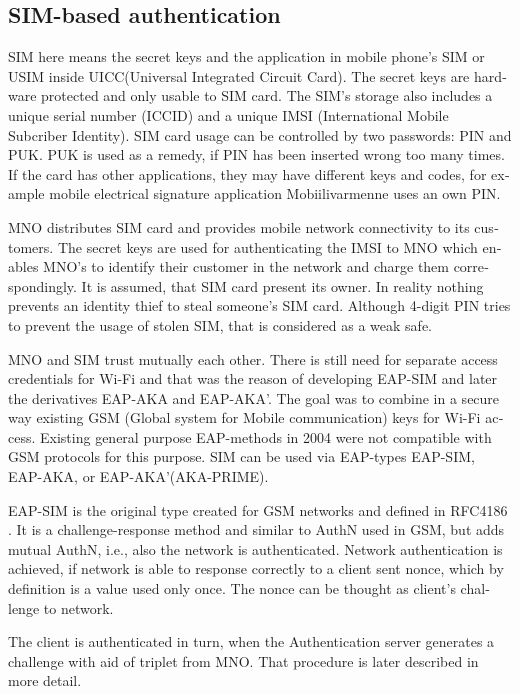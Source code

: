 \documentclass[12pt,a4paper,english]{tutthesis}
\begin{document}
\begin{otherlanguage}{english}
\section{SIM-based authentication}
\label{sec-2-5}
\label{sec:sim-based-auth}
SIM here means the secret keys and the application in mobile phone's
SIM or USIM inside UICC(Universal Integrated Circuit Card).
The secret keys are hardware protected and only usable to SIM card.
  The SIM's
storage also includes a unique serial number (ICCID) and  a unique IMSI
(International Mobile Subcriber Identity).  SIM card usage can be
controlled by two passwords: PIN and PUK.  PUK is used as a remedy, if
PIN has been inserted wrong too many times.  If the card has other
applications, they may have different keys and codes, for example
mobile electrical signature application Mobiilivarmenne uses an own
PIN.

MNO distributes SIM card and provides mobile network connectivity to
its customers.  The secret keys are used for authenticating the IMSI
to MNO which enables MNO's to identify their customer in the network
and charge them correspondingly. It is assumed, that SIM card present
its owner. In reality nothing prevents an identity thief to steal
someone's SIM card. Although 4-digit PIN tries to prevent the usage of 
stolen SIM, that is considered as a weak safe\cite[31]{aaa-nakhjiri2005}.

MNO and SIM trust mutually each other.
There is still need for separate access credentials for Wi-Fi and
that was the reason of developing EAP-SIM and later the derivatives
EAP-AKA and EAP-AKA'.
The goal was to combine in a secure way existing GSM (Global system
for Mobile communication) keys for Wi-Fi
access. Existing general purpose EAP-methods in 2004 were not
compatible with GSM protocols for this purpose. \cite[p.93]{hav-doc}
SIM can be used via EAP-types EAP-SIM,
EAP-AKA, or EAP-AKA'(AKA-PRIME).

EAP-SIM is the original type created for GSM networks and defined 
in RFC4186 \cite{rfc4186}.
It is a challenge-response method and similar to AuthN used in GSM, 
but adds mutual AuthN, i.e., also the network is authenticated.
Network authentication is achieved, if 
network is able to response correctly to a client sent nonce,
which by definition is a value used only once. The nonce can
be thought as  client's challenge to network.

The client is authenticated in turn, when the Authentication server
generates a challenge with aid of triplet from MNO.
That procedure is later described in more detail.


\end{otherlanguage}
\end{document}
